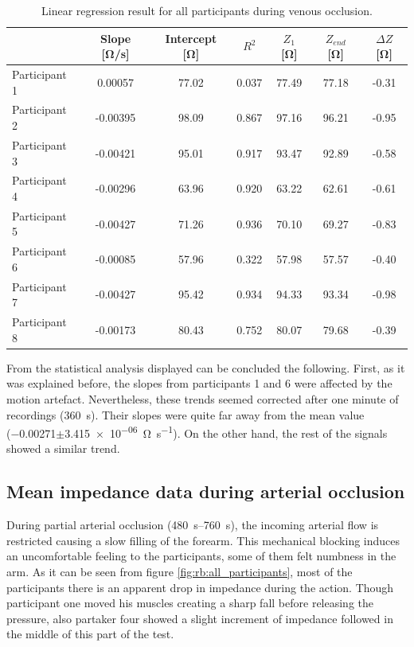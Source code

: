 \begin{table}[htbp]
	\caption{Linear regression result for all participants during venous occlusion.}
	\label{tbl:venous_occlusion:region2}
	\centering
	\begin{tabu}{lcccccc}
		\toprule
		& \textbf{Slope [\si{\ohm/\second}]} & \textbf{Intercept [\si{\ohm}]} & \textbf{$R^2$} & \textbf{$Z_1$ [\si{\ohm}]} & \textbf{$Z_{end}$ [\si{\ohm}]} & \textbf{ $\Delta Z$ [\si{\ohm}]} \\ \midrule
		Participant 1  &   0.00057  &  77.02   &     0.037  &  77.49  &  77.18  &  -0.31\\
		Participant 2  &  -0.00395  &  98.09   &     0.867  &  97.16  &  96.21  &  -0.95\\
		Participant 3  &  -0.00421  &  95.01   &     0.917  &  93.47  &  92.89  &  -0.58\\
		Participant 4  &  -0.00296  &  63.96   &     0.920  &  63.22  &  62.61  &  -0.61\\
		Participant 5  &  -0.00427  &  71.26   &     0.936  &  70.10  &  69.27  &  -0.83\\
		Participant 6  &  -0.00085  &  57.96   &     0.322  &  57.98  &  57.57  &  -0.40\\
		Participant 7  &  -0.00427  &  95.42   &     0.934  &  94.33  &  93.34  &  -0.98\\
		Participant 8  &  -0.00173  &  80.43   &     0.752  &  80.07  &  79.68  &  -0.39\\ \bottomrule
	\end{tabu} 
\end{table}

From the statistical analysis displayed can be concluded the following. First, as it was explained before, the slopes from participants 1 and 6 were affected by the motion artefact. Nevertheless, these trends seemed corrected after one minute of recordings (\SI{360}{\second}). Their slopes were quite far away from the mean value (\num{-0.00271}$\pm$\SI{3.415e-06}{\ohm\per\second}). On the other hand, the rest of the signals showed a similar trend. 


\subsection{Mean impedance data during arterial occlusion}
\label{section5.2.3}
During partial arterial occlusion (\SIrange{480}{760}{\second}), the incoming arterial flow is restricted causing a slow filling of the forearm. This mechanical blocking induces an uncomfortable feeling to the participants, some of them felt numbness in the arm.  As it can be seen from figure \ref{fig:rb:all_participants}, most of the participants there is an apparent drop in impedance during the action. Though participant one moved his muscles creating a sharp fall before releasing the pressure, also partaker four showed a slight increment of impedance followed in the middle of this part of the test. 


